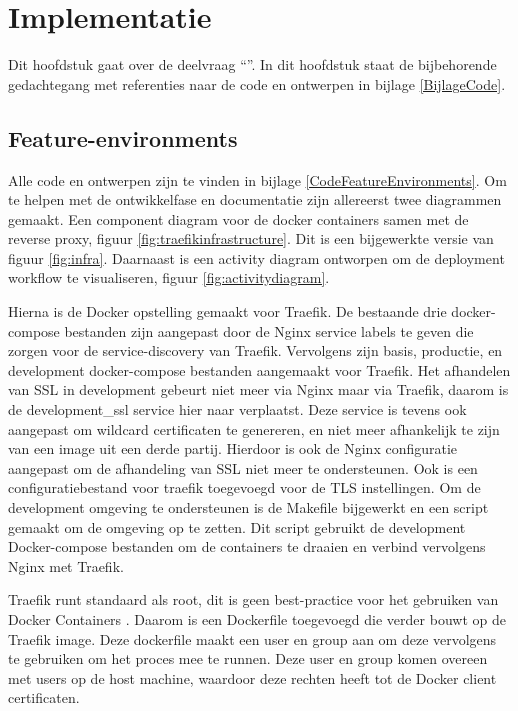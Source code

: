 \chapter{Implementatie}

\label{Chapter6}

Dit hoofdstuk gaat over de deelvraag \enquote{\deelimplementatie}. In dit hoofdstuk staat de bijbehorende gedachtegang met referenties naar de code en ontwerpen in bijlage \ref{BijlageCode}.

\section{Feature-environments}

Alle code en ontwerpen zijn te vinden in bijlage \ref{CodeFeatureEnvironments}. Om te helpen met de ontwikkelfase en documentatie zijn allereerst twee diagrammen gemaakt. Een component diagram voor de docker containers samen met de reverse proxy, figuur \ref{fig:traefikinfrastructure}. Dit is een bijgewerkte versie van figuur \ref{fig:infra}. Daarnaast is een activity diagram ontworpen om de deployment workflow te visualiseren, figuur \ref{fig:activitydiagram}.

Hierna is de Docker opstelling gemaakt voor Traefik. De bestaande drie docker-compose bestanden zijn aangepast door de Nginx service labels te geven die zorgen voor de service-discovery van Traefik. Vervolgens zijn basis, productie, en development docker-compose bestanden aangemaakt voor Traefik. Het afhandelen van SSL in development gebeurt niet meer via Nginx maar via Traefik, daarom is de development\_ssl service hier naar verplaatst. Deze service is tevens ook aangepast om wildcard certificaten te genereren, en niet meer afhankelijk te zijn van een image uit een derde partij. Hierdoor is ook de Nginx configuratie aangepast om de afhandeling van SSL niet meer te ondersteunen. Ook is een configuratiebestand voor traefik toegevoegd voor de TLS instellingen. Om de development omgeving te ondersteunen is de Makefile bijgewerkt en een script gemaakt om de omgeving op te zetten. Dit script gebruikt de development Docker-compose bestanden om de containers te draaien en verbind vervolgens Nginx met Traefik.

Traefik runt standaard als root, dit is geen best-practice voor het gebruiken van Docker Containers \parencite{DockerBestPractices}. Daarom is een Dockerfile toegevoegd die verder bouwt op de Traefik image. Deze dockerfile maakt een user en group aan om deze vervolgens te gebruiken om het proces mee te runnen. Deze user en group komen overeen met users op de host machine, waardoor deze rechten heeft tot de Docker client certificaten.

